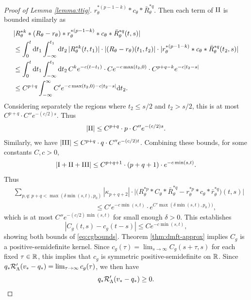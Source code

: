 \begin{proof}[Proof of Lemma \ref{lemma:ttig}]
$r_\theta^{*(p-1-k)}*c_\theta*\bar R_\theta^{*q}$.
Then each term of $\mathrm{II}$ is bounded similarly as
\begin{align*}
&|R_\theta^{*k} * (R_\theta-r_\theta)
*r_\theta^{*(p-1-k)}*c_\theta*\bar R_\theta^{*q}(t,s)|\\
&\leq \int_0^t \mathrm{d} t_1 \int_{-\infty}^{t_1} \mathrm{d} t_2\,
|R_\theta^{*k}(t,t_1)| \cdot |(R_\theta-r_\theta)(t_1,t_2)|
\cdot |r_\theta^{*(p-1-k)}*c_\theta*\bar R_\theta^{*q}(t_2,s)|\\
&\leq \int_0^t \mathrm{d} t_1 \int_{-\infty}^{t_1} \mathrm{d} t_2\,
C^k e^{-c(t-t_1)} \cdot Ce^{-c\max(t_2,0)}
\cdot C^{p+q-k}e^{-c|t_2-s|}\\
&\leq C^{p+q}\int_{-\infty}^\infty
C'e^{-c\max(t_2,0)-c|t_2-s|}\mathrm{d} t_2.
\end{align*}
Considering separately the regions where $t_2 \leq s/2$ and $t_2>s/2$, this is
at most $C^{p+q} \cdot C''e^{-(c/2)s}$. Thus
\[|\mathrm{II}| \leq C^{p+q} \cdot p \cdot C''e^{-(c/2)s}.\]
Similarly, we have $|\mathrm{III}| \leq C^{p+q} \cdot q \cdot C''e^{-(c/2)t}$. Combining
these bounds, for some constants $C,c>0$,
\[|\mathrm{I}+\mathrm{II}+\mathrm{III}| \leq C^{p+q+1} \cdot (p+q+1) \cdot e^{-c\min(s,t)}.\]
Thus
\begin{align*}
&\sum_{p,q:\,p+q<\max(\delta\min(s,t),p_0)}
|\kappa_{p+q+2}| \cdot \big|\big(R_\theta^{*p} * C_\theta * \bar R_\theta^{*q}
-r_\theta^{*p} * c_\theta * \bar r_\theta^{*q}\big)(t,s)\big|\\
&\hspace{2in}\leq C'e^{-c\min(s,t)} \cdot e^{C'\max(\delta\min(s,t),p_0))},
\end{align*}
which is at most $C''e^{-(c/2)\min(s,t)}$ for small enough $\delta>0$. This
establishes
\[|C_g(t,s)-c_g(t-s)| \leq Ce^{-c\min(s,t)},\]
showing both bounds of \eqref{eq:cgbounds}.
Theorem \ref{thm:dmft-approx} implies $C_g$ is a positive-semidefinite kernel.
Since $c_g(\tau)=\lim_{s \to \infty} C_g(s+\tau,s)$ for each fixed $\tau
\in \mathbb{R}$, this implies that $c_g$ is symmetric positive-semidefinite
on $\mathbb{R}$. Since $q_*\mathcal{R}_\Lambda'(v_*-q_*)=\lim_{\tau \to \infty}
c_g(\tau)$, we then have
\[q_*\mathcal{R}_\Lambda'(v_*-q_*) \geq 0.\]


\end{proof}
